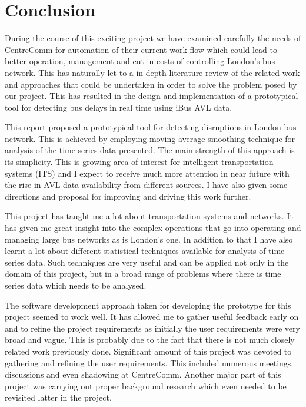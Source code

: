 \chapter{Conclusion}
During the course of this exciting project we have examined carefully the needs of CentreComm for automation of their current work flow which could lead to better operation, management and cut in costs of controlling London's bus network. This has naturally let to a in depth literature review of the related work and approaches that could be undertaken in order to solve the problem posed by our project. This has resulted in the design and implementation of a prototypical tool for detecting bus delays in real time using iBus AVL data.


This report proposed a prototypical tool for detecting disruptions in London bus network. This is achieved by employing moving average smoothing technique for analysis of the time series data presented. The main strength of this approach is its simplicity. This is growing area of interest for intelligent transportation systems (ITS) and I expect to receive much more attention in near future with the rise in AVL data availability from different sources. I have also given some directions and proposal for improving and driving this work further.

This project has taught me a lot about transportation systems and networks. It has given me great insight into the complex operations that go into operating and managing large bus networks as is London's one. In addition to that I have also learnt a lot about different statistical techniques available for analysis of time series data. Such techniques are very useful and can be applied not only in the domain of this project, but in a broad range of problems where there is time series data which needs to be analysed. 

The software development approach taken for developing the prototype for this project seemed to work well. It has allowed me to gather useful feedback early on and to refine the project requirements as initially the user requirements were very broad and vague. This is probably due to the fact that there is not much closely related work previously done. Significant amount of this project was devoted to gathering and refining the user requirements. This included numerous meetings, discussions and even shadowing at CentreComm. Another major part of this project was carrying out proper background research which even needed to be revisited latter in the project. 

